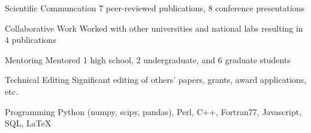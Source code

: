 


\begin{cvskills}


\cvskill
{Scientific Communcation} %
{7 peer-reviewed publications, 8 conference presentations} %


\cvskill
{Collaborative Work} %
{Worked with other universities and national labs resulting in 4 publications} %


\cvskill
{Mentoring} %
{Mentored 1 high school, 2 undergraduate, and 6 graduate students} %


\cvskill
{Technical Editing} %
{Significant editing of others' papers, grants, award applications, etc.} %


\cvskill
{Programming} %
{Python (numpy, scipy, pandas), Perl, C++, Fortran77, Javascript, SQL, LaTeX} %


\end{cvskills}
